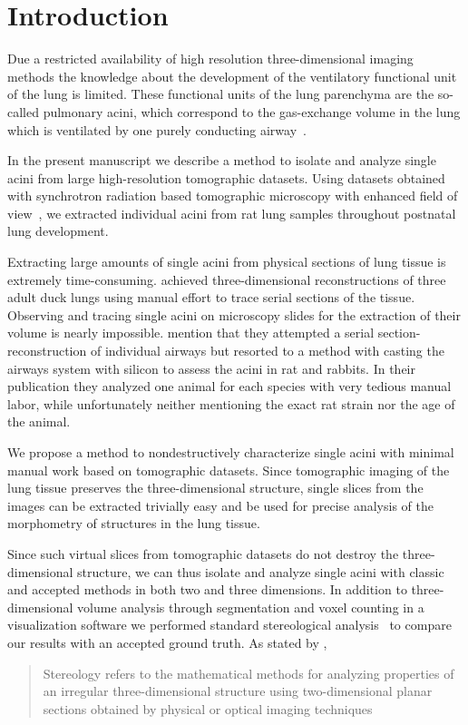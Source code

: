 \documentclass[twoside,paper=a4,abstract=true,english,DIVcalc]{scrartcl}
\begin{document}
\clearpage
\section{Introduction}
Due a restricted availability of high resolution three-dimensional imaging methods the knowledge about the development of the ventilatory functional unit of the lung is limited. These functional units of the lung parenchyma are the so-called pulmonary acini, which correspond to the gas-exchange volume in the lung which is ventilated by one purely conducting airway~\cite{Rodriguez1987}.

In the present manuscript we describe a method to isolate and analyze single acini from large high-resolution tomographic datasets. Using datasets obtained with synchrotron radiation based tomographic microscopy with enhanced field of view~\cite{Haberthuer2010a}, we extracted individual acini from rat lung samples throughout postnatal lung development. 

Extracting large amounts of single acini from physical sections of lung tissue is extremely time-consuming. \citet{Woodward2005} achieved three-dimensional reconstructions of three adult duck lungs using manual effort to trace serial sections of the tissue. Observing and tracing single acini on microscopy slides for the extraction of their volume is nearly impossible. \citet{Rodriguez1987} mention that they attempted a serial section-reconstruction of individual airways but resorted to a method with casting the airways system with silicon to assess the acini in rat and rabbits. In their publication they analyzed one animal for each species with very tedious manual labor, while unfortunately neither mentioning the exact rat strain nor the age of the animal.

We propose a method to nondestructively characterize single acini with minimal manual work based on tomographic datasets. Since tomographic imaging of the lung tissue preserves the three-dimensional structure, single slices from the images can be extracted trivially easy and be used for precise analysis of the morphometry of structures in the lung tissue.

Since such virtual slices from tomographic datasets do not destroy the three-dimensional structure, we can thus isolate and analyze single acini with classic and accepted methods in both two and three dimensions. In addition to three-dimensional volume analysis through segmentation and voxel counting in a visualization software we performed standard stereological analysis~\cite{Hsia2010} to compare our results with an accepted ground truth. As stated by \citet{Hsia2010}, \blockquote{Stereology refers to the mathematical methods for analyzing properties of an irregular three-dimensional structure using two-dimensional planar sections obtained by physical or optical imaging techniques}.
\end{document}
